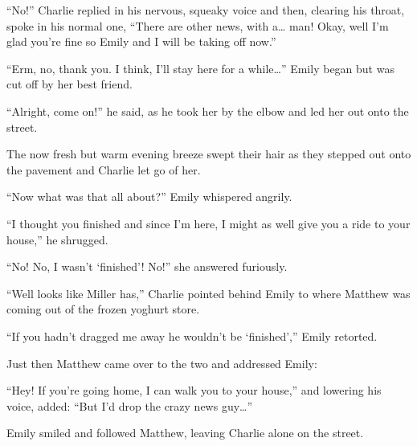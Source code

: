 “No!” Charlie replied in his nervous, squeaky voice and then, clearing his throat, spoke in his normal one, “There are other news, with a… man! Okay, well I’m glad you’re fine so Emily and I will be taking off now.”

“Erm, no, thank you. I think, I’ll stay here for a while…” Emily began but was cut off by her best friend.

“Alright, come on!” he said, as he took her by the elbow and led her out onto the street.

The now fresh but warm evening breeze swept their hair as they stepped out onto the pavement and Charlie let go of her.
  
“Now what was that all about?” Emily whispered angrily.

“I thought you finished and since I’m here, I might as well give you a ride to your house,” he shrugged.

“No! No, I wasn’t ‘finished’! No!” she answered furiously.

“Well looks like Miller has,” Charlie pointed behind Emily to where Matthew was coming out of the frozen yoghurt store.

“If you hadn’t dragged me away he wouldn’t be ‘finished’,” Emily retorted.

Just then Matthew came over to the two and addressed Emily:

“Hey! If you’re going home, I can walk you to your house,” and lowering his voice, added: “But I’d drop the crazy news guy…”

Emily smiled and followed Matthew, leaving Charlie alone on the street.